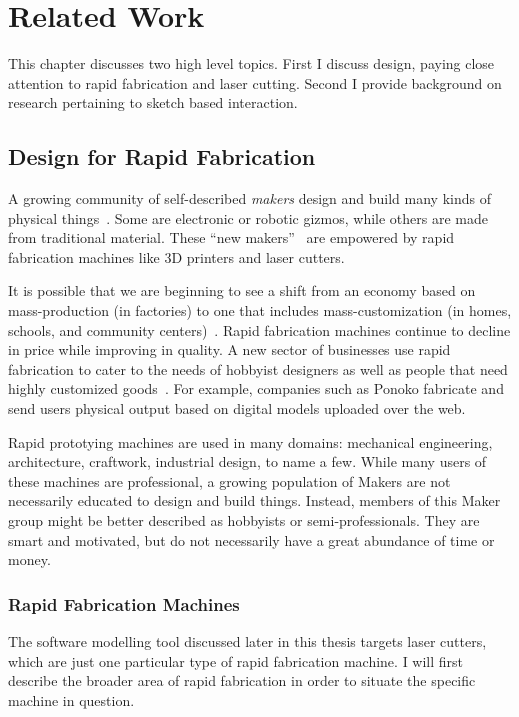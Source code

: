 \chapter{Related Work}
\label{sec:rw}

This chapter discusses two high level topics. First I discuss design,
paying close attention to rapid fabrication and laser cutting. Second
I provide background on research pertaining to sketch based interaction.

\section{Design for Rapid Fabrication}

A growing community of self-described \textit{makers} design and build
many kinds of physical things~\cite{gershenfeld-fab}. Some are
electronic or robotic gizmos, while others are made from traditional
material. These ``new makers''~\cite{gross-new-makers} are empowered
by rapid fabrication machines like 3D printers and laser cutters.

It is possible that we are beginning to see a shift from an economy
based on mass-production (in factories) to one that includes
mass-customization (in homes, schools, and community
centers)~\cite{economist-fab}. Rapid fabrication machines continue to
decline in price while improving in quality. A new sector of
businesses use rapid fabrication to cater to the needs of hobbyist
designers as well as people that need highly customized
goods~\cite{paulos-citizenscience}. For example, companies such as
Ponoko fabricate and send users physical output based on digital
models uploaded over the web.

Rapid prototying machines are used in many domains: mechanical
engineering, architecture, craftwork, industrial design, to name a
few. While many users of these machines are professional, a growing
population of Makers are not necessarily educated to design and build
things. Instead, members of this Maker group might be better described
as hobbyists or semi-professionals. They are smart and motivated, but
do not necessarily have a great abundance of time or money.

\subsection{Rapid Fabrication Machines}

The software modelling tool discussed later in this thesis targets
laser cutters, which are just one particular type of rapid fabrication
machine. I will first describe the broader area of rapid fabrication
in order to situate the specific machine in question.

